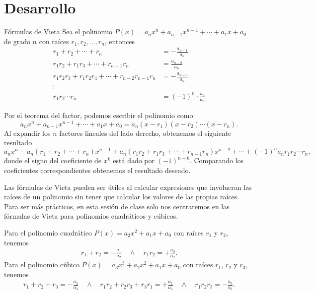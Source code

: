 \section{Desarrollo}

\begin{theorem.tcb}{Fórmulas de Vieta}{}
    Sea el polinomio $P(x) = a_n x^n + a_{n - 1} x^{n - 1} + \cdots  + a_1 x + a_0$ de grado $n$ con raíces $r_1, r_2, \ldots, r_n$,
    entonces
    \begin{align*}
        r_1 + r_2 + \cdots + r_n &= - \frac{a_{n - 1}}{a_n}\\
        r_1 r_2 + r_1 r_3 + \cdots + r_{n - 1} r_n &= \frac{a_{n - 2}}{a_n}\\
        r_1 r_2 r_3 + r_1 r_2 r_4 + \cdots + r_{n - 2} r_{n - 1} r_n &= -\frac{a_{n - 3}}{a_n}\\
        \vdots\\
        r_1 r_2 \cdots r_n &= (-1)^n \cdot \frac{a_0}{a_n}
    \end{align*}
\end{theorem.tcb}

Por el teorema del factor, podemos escribir el polinomio como
\[
    a_n x^n + a_{n - 1} x^{n - 1} + \cdots  + a_1 x + a_0 = a_n (x - r_1)(x - r_2) \cdots (x - r_n).
\]
Al expandir los $n$ factores lineales del lado derecho, obtenemos el siguiente resultado
\[
    a_n x^n - a_n(r_1 + r_2 + \cdots + r_n)x^{n - 1} + a_n(r_1 r_2 + r_1 r_3 + \cdots + r_{n - 1} r_n)x^{n - 2} + \cdots + (-1)^n a_n r_1 r_2 \cdots r_n,
\]
donde el signo del coeficiente de $x^k$ está dado por $(-1)^{n - k}$.
Comparando los coeficientes correspondientes obtenemos el resultado deseado.

Las fórmulas de Vieta pueden ser útiles al calcular expresiones que involucran las raíces de un polinomio sin tener que calcular los valores de las propias raíces.
Para ser más prácticos, en esta sesión de clase solo nos centraremos en las fórmulas de Vieta para polinomios cuadráticos y cúbicos.

\begin{remark.tcb}
    Para el polinomio cuadrático $P(x) = a_2 x^2 + a_1 x + a_0$ con raíces $r_1$ y $r_2$, tenemos
    \begin{align*}
        r_1 + r_2 = - \frac{a_1}{a_2} \quad \land \quad
        r_1 r_2 = +\frac{a_0}{a_2}.
    \end{align*}
    Para el polinomio cúbico $P(x) = a_3 x^3 + a_2 x^2 + a_1 x + a_0$ con raíces $r_1$, $r_2$ y $r_3$, tenemos
    \begin{align*}
        r_1 + r_2 + r_3 = - \frac{a_2}{a_3} \quad \land \quad
        r_1 r_2 + r_2 r_3 + r_3 r_1 = +\frac{a_1}{a_3} \quad \land \quad
        r_1 r_2 r_3 = - \frac{a_0}{a_3}.
    \end{align*}
\end{remark.tcb}

